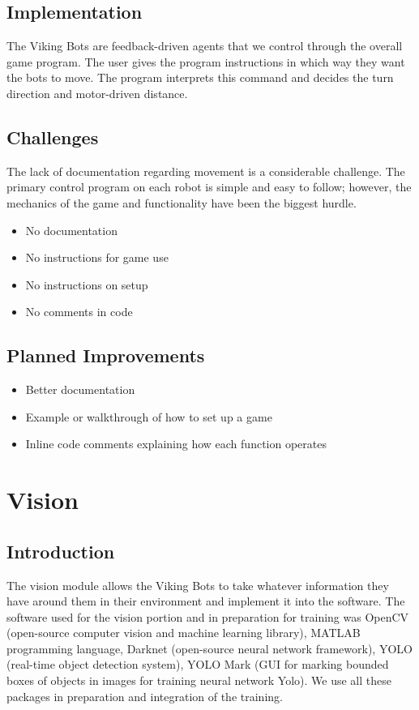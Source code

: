 \documentclass[a4paper,12pt]{article}
\begin{document}
\subsection{Implementation}
	The Viking Bots are feedback-driven agents that we control through the overall game program. The user gives the program instructions in which way they want the bots to move. The program interprets this command and decides the turn direction and motor-driven distance.

\subsection{Challenges}
	The lack of documentation regarding movement is a considerable challenge. The primary control program on each robot is simple and easy to follow; however, the mechanics of the game and functionality have been the biggest hurdle. 
	\begin{itemize}
		\item No documentation
		\item No instructions for game use
		\item No instructions on setup
		\item No comments in code
	\end{itemize}

\subsection{Planned Improvements}
	\begin{itemize}
		\item Better documentation
		\item Example or walkthrough of how to set up a game
		\item Inline code comments explaining how each function operates
	\end{itemize}
	
	
\section{Vision}
\subsection{Introduction}
	The vision module allows the Viking Bots to take whatever information they have around them in their environment and implement it into the software. The software used for the vision portion and in preparation for training was OpenCV (open-source computer vision and machine learning library), MATLAB programming language, Darknet (open-source neural network framework), YOLO (real-time object detection system), YOLO Mark (GUI for marking bounded boxes of objects in images for training neural network Yolo). We use all these packages in preparation and integration of the training.
\end{document}
